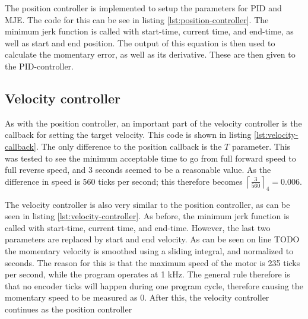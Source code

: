 \documentclass[11pt]{article}
\begin{document}


The position controller is implemented to setup the parameters for PID and MJE. The code for this can be see in listing \vref{lst:position-controller}. The minimum jerk function is called with start-time, current time, and end-time, as well as start and end position. The output of this equation is then used to calculate the momentary error, as well as its derivative. These are then given to the PID-controller. \par



\subsection{Velocity controller}
As with the position controller, an important part of the velocity controller is the callback for setting the target velocity. This code is shown in listing \vref{lst:velocity-callback}. The only difference to the position callback is the $T$ parameter. This was tested to see the minimum acceptable time to go from full forward speed to full reverse speed, and 3 seconds seemed to be a reasonable value. As the difference in speed is 560 ticks per second; this therefore becomes $\left\lceil\frac{3}{560}\right\rceil _4 = 0.006$. \par



The velocity controller is also very similar to the position controller, as can be seen in listing \vref{lst:velocity-controller}. As before, the minimum jerk function is called with start-time, current time, and end-time. However, the last two parameters are replaced by  start and end velocity. As can be seen on line TODO the momentary velocity is smoothed using a sliding integral, and normalized to seconds. The reason for this is that the maximum speed of the motor is 235 ticks per second, while the program operates at 1 kHz. The general rule therefore is that no encoder ticks will happen during one program cycle, therefore causing the momentary speed to be measured as 0. After this, the velocity controller continues as the position controller
\end{document}
